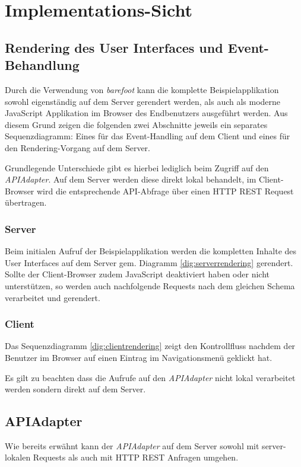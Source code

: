 \section{Implementations-Sicht}
\label{sec:sad-implementation}

\subsection{Rendering des User Interfaces und Event-Behandlung}
Durch die Verwendung von \emph{barefoot} \cite{Barefoot} kann die komplette Beispielapplikation sowohl eigenständig auf dem Server gerendert werden, als auch als moderne JavaScript Applikation im Browser des Endbenutzers ausgeführt werden. Aus diesem Grund zeigen die folgenden zwei Abschnitte jeweils ein separates Sequenzdiagramm: Eines für das Event-Handling auf dem Client und eines für den Rendering-Vorgang auf dem Server.

Grundlegende Unterschiede gibt es hierbei lediglich beim Zugriff auf den \emph{APIAdapter}. Auf dem Server werden diese direkt lokal behandelt, im Client-Browser wird die entsprechende API-Abfrage über einen HTTP REST Request übertragen.

\subsubsection*{Server}
Beim initialen Aufruf der Beispielapplikation werden die kompletten Inhalte des User Interfaces auf dem Server gem. Diagramm \ref{dig:serverrendering} gerendert. Sollte der Client-Browser zudem JavaScript deaktiviert haben oder nicht unterstützen, so werden auch nachfolgende Requests nach dem gleichen Schema verarbeitet und gerendert.



\subsubsection*{Client}
Das Sequenzdiagramm \ref{dig:clientrendering} zeigt den Kontrollfluss nachdem der Benutzer im Browser auf einen Eintrag im Navigationsmenü geklickt hat.

Es gilt zu beachten dass die Aufrufe auf den \emph{APIAdapter} nicht lokal verarbeitet werden sondern direkt auf dem Server.




\subsection{APIAdapter}
Wie bereits erwähnt kann der \emph{APIAdapter} auf dem Server sowohl mit server-lokalen Requests als auch mit HTTP REST Anfragen umgehen.

